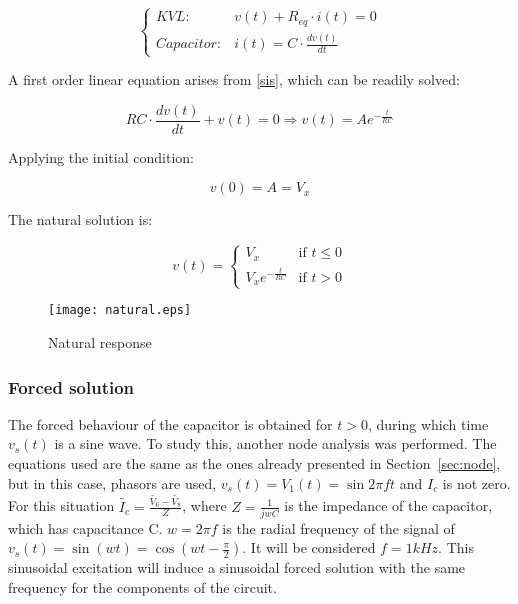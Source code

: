 \begin{equation}
  \begin{cases}
    KVL: & v(t) + R_{eq} \cdot i(t) = 0 \\
    Capacitor: & i(t) = C \cdot \frac{dv(t)}{dt}
  \end{cases}
  \label{sis}
\end{equation}

A first order linear equation arises from \ref{sis}, which can be readily solved:

\begin{equation}
  RC \cdot \frac{dv(t)}{dt} + v(t) = 0 \Rightarrow v(t) = Ae^{-\frac{t}{RC}}
\end{equation}

Applying the initial condition:

\begin{equation}
  v(0) = A = V_x
\end{equation}

The natural solution is:

\begin{equation}
  \label{nat_sol} v(t) =
  \begin{cases}
    V_x & \mbox{if } t \leq 0 \\
    V_xe^{-\frac{t}{RC}} & \mbox{if } t > 0
  \end{cases}
\end{equation}

\begin{figure}[H]
  \centering
  \texttt{[image: natural.eps]}
  \caption{Natural response}
  \label{fig:nat}
\end{figure}

\subsubsection{Forced solution}

The forced behaviour of the capacitor is obtained for $t > 0$, during which time $v_s(t)$ is a sine wave. To study this, another node analysis was performed. The equations used are the same as the ones already presented in Section~\ref{sec:node}, but in this case, phasors are used, $v_s(t) = V_1(t) = \sin{2\pi ft}$ and $I_c$ is not zero. For this situation $\widetilde{I_c} = \frac{\widetilde{V_6}-\widetilde{V_8}}{Z}$, where $Z = \frac{1}{jwC}$ is the impedance of the capacitor, which has capacitance C. $w = 2\pi f$ is the radial frequency of the signal of $v_s(t) = \sin(wt) = \cos(wt-\frac{\pi}{2})$. It will be considered $f = 1 kHz$. This sinusoidal excitation will induce a sinusoidal forced solution with the same frequency for the components of the circuit.

